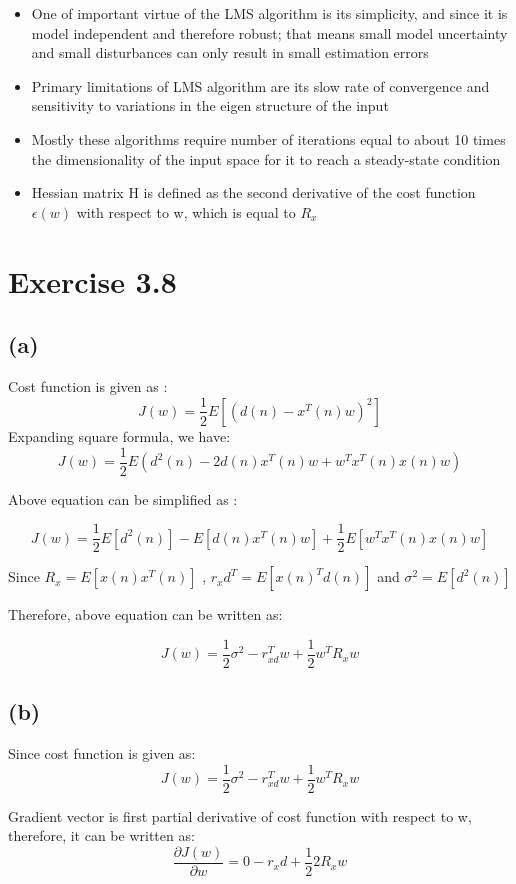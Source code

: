\documentclass[12pt]{article}
\begin{document}
\begin{itemize}
	\item One of important virtue of the LMS algorithm is its simplicity, and since it is model independent and therefore robust; that means small model uncertainty and small disturbances can only result in small estimation errors
	\item Primary limitations of LMS algorithm are its slow rate of convergence and sensitivity to variations in the eigen structure of the input
	\item Mostly these algorithms require number of iterations equal to about 10 times the dimensionality of the input space for it to reach a steady-state condition
	\item Hessian matrix H is defined as the second derivative of the cost function $\epsilon(w)$ with respect to w, which is equal to $R_x$
\end{itemize}

\section{ Exercise 3.8}
\subsection{(a)} 
Cost function is given as : $$ J(w) = \frac{1}{2} E[(d(n) - x^T(n)w )^2 ]$$ 
Expanding square formula, we have: $$ J(w) = \frac{1}{2} E( d^2(n) - 2d(n) x^T(n) w  + w^T x^T(n) x(n) w ) $$ 

Above equation can be simplified as : 

$$ J(w) = \frac{1}{2} E[d^2(n)] - E[d(n) x^T(n) w ] + \frac{1}{2} E[w^T x^T(n) x(n) w]    $$

Since $ R_x = E[x(n) x^T(n)] $ , $r_xd^T = E[x(n)^T d(n)]$ and $ \sigma^2 = E[d^2(n)] $ 

Therefore, above equation can be written as:

$$ J(w) = \frac{1}{2} \sigma^2 - r_{xd}^T w + \frac{1}{2} w^T R_x w $$


\subsection{(b)}

Since cost function is given as: $$ J(w) = \frac{1}{2} \sigma^2 - r_{xd}^T w + \frac{1}{2} w^T R_x w $$

Gradient vector is first partial derivative of cost function with respect to w, therefore, it can be written as: 
	$$ \frac{\partial J(w)}{\partial w} = 0 - r_xd + \frac{1}{2} 2 R_x w $$
\end{document}
